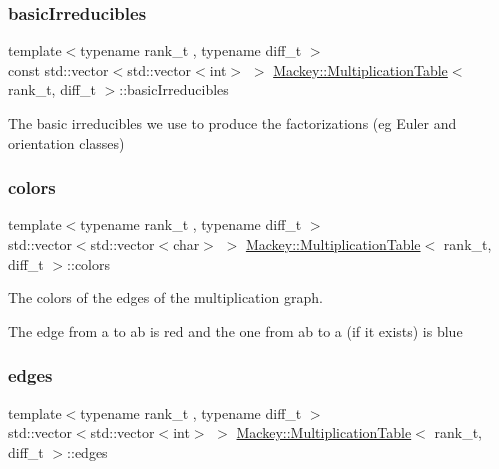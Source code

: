 \subsubsection{\texorpdfstring{basic\+Irreducibles}{basicIrreducibles}}
{\footnotesize\ttfamily template$<$typename rank\+\_\+t , typename diff\+\_\+t $>$ \\
const std\+::vector$<$std\+::vector$<$int$>$ $>$ \hyperlink{classMackey_1_1MultiplicationTable}{Mackey\+::\+Multiplication\+Table}$<$ rank\+\_\+t, diff\+\_\+t $>$\+::basic\+Irreducibles\hspace{0.3cm}{\ttfamily [protected]}}



The basic irreducibles we use to produce the factorizations (eg Euler and orientation classes) 

\mbox{\label{classMackey_1_1MultiplicationTable_a11dcad2d104dfd310c8d3439fa00a4ce}} 
\subsubsection{\texorpdfstring{colors}{colors}}
{\footnotesize\ttfamily template$<$typename rank\+\_\+t , typename diff\+\_\+t $>$ \\
std\+::vector$<$std\+::vector$<$char$>$ $>$ \hyperlink{classMackey_1_1MultiplicationTable}{Mackey\+::\+Multiplication\+Table}$<$ rank\+\_\+t, diff\+\_\+t $>$\+::colors\hspace{0.3cm}{\ttfamily [protected]}}



The colors of the edges of the multiplication graph. 

The edge from a to ab is red and the one from ab to a (if it exists) is blue \mbox{\label{classMackey_1_1MultiplicationTable_a3e1f526da86649b8a41465d27395d04b}} 
\subsubsection{\texorpdfstring{edges}{edges}}
{\footnotesize\ttfamily template$<$typename rank\+\_\+t , typename diff\+\_\+t $>$ \\
std\+::vector$<$std\+::vector$<$int$>$ $>$ \hyperlink{classMackey_1_1MultiplicationTable}{Mackey\+::\+Multiplication\+Table}$<$ rank\+\_\+t, diff\+\_\+t $>$\+::edges\hspace{0.3cm}{\ttfamily [protected]}}



